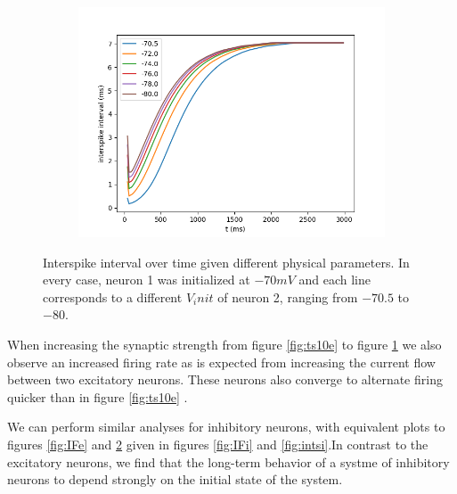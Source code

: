 \documentclass{article}
\begin{document}
\begin{figure}[h]
	\hspace{0.03\linewidth}
	\begin{subfigure}[t]{0.30\linewidth}
		\centering
		\includegraphics[width = 1.0\linewidth, trim={20 10 20 20}, clip=true]{intervals_ts_10_rmgs_05e.png}
		\label{fig:ts10rmgs}	
	\end{subfigure}%
\caption{Interspike interval over time given different physical parameters. In every case, neuron 1 was initialized at $-70 mV$ and each line corresponds to a different $V_init$ of neuron 2, ranging from $-70.5$ to $-80$.}
\label{fig:intse}
\end{figure}

When increasing the synaptic strength from figure \ref{fig:ts10e} to figure \ref{fig:ts10rmgs} we also observe an increased firing rate as is expected from increasing the current flow between two excitatory neurons. These neurons also converge to alternate firing quicker than in figure \ref{fig:ts10e} .

We can perform similar analyses for inhibitory neurons, with equivalent plots to figures \ref{fig:IFe} and \ref{fig:intse} given in figures \ref{fig:IFi} and \ref{fig:intsi}.In contrast to the excitatory neurons, we find that the long-term behavior of a systme of inhibitory neurons to depend strongly on the initial state of the system.
\end{document}
